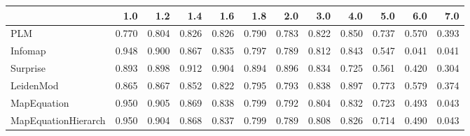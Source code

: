 \begin{tabular}{lrrrrrrrrrrr}
\toprule
{} &   1.0 &   1.2 &   1.4 &   1.6 &   1.8 &   2.0 &   3.0 &   4.0 &   5.0 &   6.0 &   7.0 \\
\midrule
PLM                 & 0.770 & 0.804 & 0.826 & 0.826 & 0.790 & 0.783 & 0.822 & 0.850 & 0.737 & 0.570 & 0.393 \\
Infomap             & 0.948 & 0.900 & 0.867 & 0.835 & 0.797 & 0.789 & 0.812 & 0.843 & 0.547 & 0.041 & 0.041 \\
Surprise            & 0.893 & 0.898 & 0.912 & 0.904 & 0.894 & 0.896 & 0.834 & 0.725 & 0.561 & 0.420 & 0.304 \\
LeidenMod           & 0.865 & 0.867 & 0.852 & 0.822 & 0.795 & 0.793 & 0.838 & 0.897 & 0.773 & 0.579 & 0.374 \\
MapEquation         & 0.950 & 0.905 & 0.869 & 0.838 & 0.799 & 0.792 & 0.804 & 0.832 & 0.723 & 0.493 & 0.043 \\
MapEquationHierarch & 0.950 & 0.904 & 0.868 & 0.837 & 0.799 & 0.789 & 0.808 & 0.826 & 0.714 & 0.490 & 0.043 \\
\bottomrule
\end{tabular}
